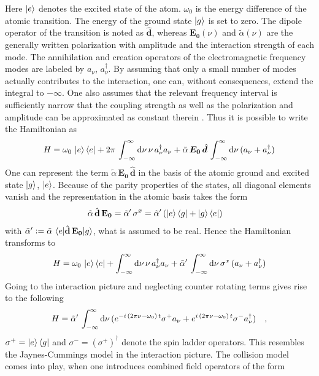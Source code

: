 Here $\ket{e}$ denotes the excited state of the atom. $\omega_0$ is the energy difference of the atomic transition. The energy of the ground state $\ket{g}$ is set to zero. The dipole operator of the transition is noted as $\hat{\mathbf{d}}$, whereas $\mathbf{E_0}(\nu)$ and $\tilde{\alpha}(\nu)$ are the generally written polarization with amplitude and the interaction strength of each mode. The annihilation and creation operators of the electromagnetic frequency modes are labeled by $a_\nu$, $a_\nu^\dagger$. By assuming that only a small number of modes actually contributes to the interaction, one can, without consequences, extend the integral to $-\infty$. One also assumes that the relevant frequency interval is sufficiently narrow that the coupling strength as well as the polarization and amplitude can be approximated as constant therein \cite{ciccarello_quantum_2022,gross_qubit_2018}. Thus it is possible to write the Hamiltonian as
\begin{align*}
    H= {\omega_0}\,\ket{e}\bra{e}+2\pi\,\int_{-\infty}^\infty\text{d}\nu\,\nu\,a^\dagger_\nu a_\nu+ \tilde{\alpha}\,\boldsymbol{E_0}\,\hat{\boldsymbol{d}}\,\int_{-\infty}^\infty\text{d}\nu\,(a_\nu+a^\dagger_\nu)
\end{align*}
One can represent the term $\tilde{\alpha}\,\mathbf{E_0}\,\hat{\mathbf{d}}$ in the basis of the atomic ground and excited state $\ket{g}$, $\ket{e}$. Because of the parity properties of the states, all diagonal elements vanish and the representation in the atomic basis takes the form
\begin{align*}
    \tilde{\alpha}\,\hat{\mathbf{d}}\,\mathbf{E_0}&= \tilde{\alpha}'\,\sigma^x=\tilde{\alpha}'\,(\ket{e}\bra{g}+\ket{g}\bra{e})
\end{align*}
with $\tilde{\alpha}'\vcentcolon=\tilde{\alpha}\,\braket{e|\hat{\mathbf{d}}\,\mathbf{E_0}|g}$, what is assumed to be real. Hence the Hamiltonian transforms to
\begin{align*}
    H= {\omega_0}\,\ket{e}\bra{e}+\int_{-\infty}^\infty\text{d}\nu\,\nu\,a^\dagger_\nu a_\nu+ \tilde{\alpha}'\,\int_{-\infty}^\infty\text{d}\nu\,\sigma^x\,(a_\nu+a^\dagger_\nu)
\end{align*}
Going to the interaction picture and neglecting counter rotating terms gives rise to the following
\begin{align*}
    H=\tilde{\alpha}'\,\int_{-\infty}^\infty\text{d}\nu\,(e^{-i\,(2\pi\nu-\omega_0)\, t}\sigma^+a_\nu+e^{i\,(2\pi\nu-\omega_0)\, t}\sigma^-a^\dagger_\nu)\quad,
\end{align*}
$\sigma^+=\ket{e}\bra{g}$ and $\sigma^-=(\sigma^+)^\dagger$ denote the spin ladder operators. This resembles the Jaynes-Cummings model in the interaction picture. The collision model comes into play, when one introduces combined field operators of the form
